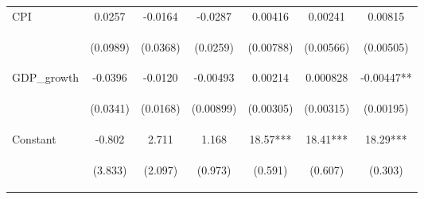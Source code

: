 \documentclass[]{article}
\begin{document}
\begin{center}
\begin{tabular}{lcccccc}
CPI & 0.0257 & -0.0164 & -0.0287 & 0.00416 & 0.00241 & 0.00815 \\
\vspace{4pt} & \begin{footnotesize}(0.0989)\end{footnotesize} & \begin{footnotesize}(0.0368)\end{footnotesize} & \begin{footnotesize}(0.0259)\end{footnotesize} & \begin{footnotesize}(0.00788)\end{footnotesize} & \begin{footnotesize}(0.00566)\end{footnotesize} & \begin{footnotesize}(0.00505)\end{footnotesize} \\
GDP\_growth & -0.0396 & -0.0120 & -0.00493 & 0.00214 & 0.000828 & -0.00447** \\
\vspace{4pt} & \begin{footnotesize}(0.0341)\end{footnotesize} & \begin{footnotesize}(0.0168)\end{footnotesize} & \begin{footnotesize}(0.00899)\end{footnotesize} & \begin{footnotesize}(0.00305)\end{footnotesize} & \begin{footnotesize}(0.00315)\end{footnotesize} & \begin{footnotesize}(0.00195)\end{footnotesize} \\
Constant & -0.802 & 2.711 & 1.168 & 18.57*** & 18.41*** & 18.29*** \\
 & \begin{footnotesize}(3.833)\end{footnotesize} & \begin{footnotesize}(2.097)\end{footnotesize} & \begin{footnotesize}(0.973)\end{footnotesize} & \begin{footnotesize}(0.591)\end{footnotesize} & \begin{footnotesize}(0.607)\end{footnotesize} & \begin{footnotesize}(0.303)\end{footnotesize} \\

\end{tabular}
\end{center}
\end{document}
